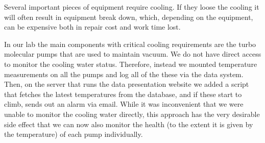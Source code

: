Several important pieces of equipment require cooling. If they loose
the cooling it will often result in equipment break down, which,
depending on the equipment, can be expensive both in repair cost and
work time lost.

In our lab the main components with critical cooling requirements are
the turbo molecular pumps that are used to maintain vacuum. We do not
have direct access to monitor the cooling water status. Therefore,
instead we mounted temperature measurements on all the pumps and log
all of the these via the data system. Then, on the server that runs
the data presentation website we added a script that fetches the
latest temperatures from the database, and if these start to climb,
sends out an alarm via email. While it was inconvenient that we were
unable to monitor the cooling water directly, this approach has the
very desirable side effect that we can now also monitor the health (to
the extent it is given by the temperature) of each pump
individually.
